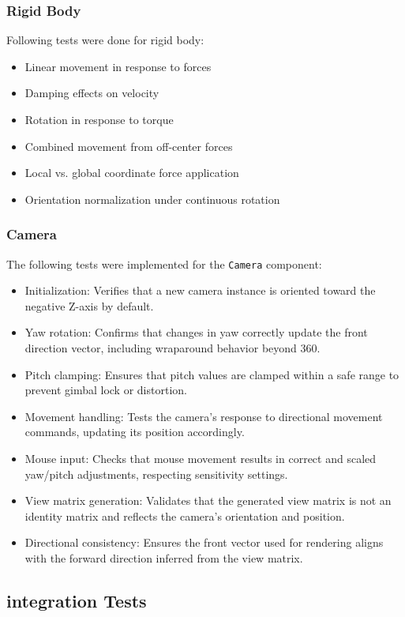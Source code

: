 \subsubsection{Rigid Body}
Following tests were done for rigid body:
\begin{itemize}
    \item Linear movement in response to forces
    \item Damping effects on velocity
    \item Rotation in response to torque
    \item Combined movement from off-center forces
    \item Local vs. global coordinate force application
    \item Orientation normalization under continuous rotation
\end{itemize}

\subsubsection{Camera}
The following tests were implemented for the \texttt{Camera} component:
\begin{itemize}
    \item Initialization: Verifies that a new camera instance is oriented toward the negative Z-axis by default.
    \item Yaw rotation: Confirms that changes in yaw correctly update the front direction vector, including wraparound behavior beyond 360\textdegree.
    \item Pitch clamping: Ensures that pitch values are clamped within a safe range to prevent gimbal lock or distortion.
    \item Movement handling: Tests the camera's response to directional movement commands, updating its position accordingly.
    \item Mouse input: Checks that mouse movement results in correct and scaled yaw/pitch adjustments, respecting sensitivity settings.
    \item View matrix generation: Validates that the generated view matrix is not an identity matrix and reflects the camera's orientation and position.
    \item Directional consistency: Ensures the front vector used for rendering aligns with the forward direction inferred from the view matrix.
\end{itemize}


\subsection{integration Tests}

